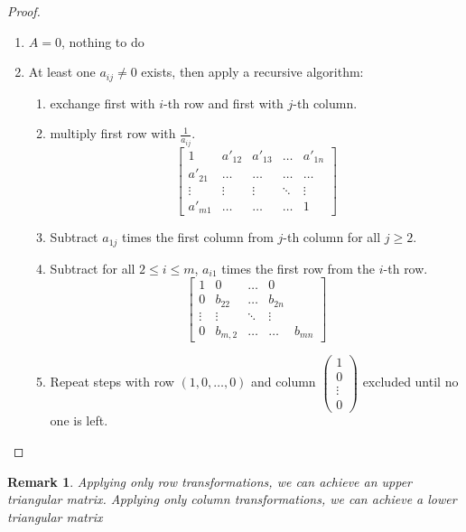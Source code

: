 \documentclass[a4paper,landscape,twocolumn]{article}
\newtheorem{rem}{Remark}
\begin{document}
\begin{proof}
  \begin{enumerate}
    \item $A = 0$, nothing to do
    \item At least one $a_{ij} \neq 0$ exists, then apply a recursive algorithm:
      \begin{enumerate}
        \item exchange first with $i$-th row and first with $j$-th column.
        \item multiply first row with $\frac1{a_{ij}}$.
          \[
            \begin{bmatrix}
              1 & a'_{12} & a'_{13} & \ldots & a'_{1n} \\
              a'_{21} & \ldots & \ldots & \ldots & \ldots \\
              \vdots & \vdots & \vdots & \ddots & \vdots \\
              a'_{m1} & \ldots & \ldots & \ldots & 1
            \end{bmatrix}
          \]
        \item
          Subtract $a_{1j}$ times the first column from $j$-th column for all $j \geq 2$.
        \item
          Subtract for all $2 \leq i \leq m$, $a_{i1}$ times the first row from the $i$-th row.
          \[
            \begin{bmatrix}
              1 & 0 & \ldots & 0 \\
              0 & b_{22} & \ldots & b_{2n} \\
              \vdots & \vdots & \ddots & \vdots \\
              0 & b_{m,2} & \ldots & \ldots & b_{mn}
            \end{bmatrix}
          \]
        \item Repeat steps with row $(1, 0, \ldots, 0)$ and column $\begin{pmatrix} 1 \\ 0 \\ \vdots \\ 0 \end{pmatrix}$ excluded until no one is left.
      \end{enumerate}
  \end{enumerate}
\end{proof}
%
\begin{rem}
  Applying only row transformations, we can achieve an upper triangular matrix.
  Applying only column transformations, we can achieve a lower triangular matrix
\end{rem}
\end{document}

